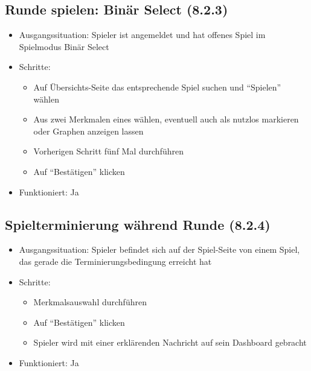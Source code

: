 \documentclass[a4paper]{scrreprt}
\begin{document}
            \subsection{Runde spielen: Binär Select (8.2.3)}
            \begin{itemize}
                \item Ausgangssituation: Spieler ist angemeldet und hat offenes Spiel im Spielmodus Binär Select
                \item Schritte:
                    \begin{itemize}
                        \item Auf Übersichts-Seite das entsprechende Spiel suchen und \enquote{Spielen} wählen
                        \item Aus zwei Merkmalen eines wählen, eventuell auch als nutzlos markieren oder Graphen anzeigen lassen
                        \item Vorherigen Schritt fünf Mal durchführen
                        \item Auf \enquote{Bestätigen} klicken
                    \end{itemize}
                \item Funktioniert: Ja
            \end{itemize}

            \subsection{Spielterminierung während Runde (8.2.4)}
            \begin{itemize}
                \item Ausgangssituation: Spieler befindet sich auf der Spiel-Seite von einem Spiel, das gerade die Terminierungsbedingung erreicht hat
                \item Schritte:
                    \begin{itemize}
                        \item Merkmalsauswahl durchführen
                        \item Auf \enquote{Bestätigen} klicken
                        \item Spieler wird mit einer erklärenden Nachricht auf sein Dashboard gebracht
                    \end{itemize}
                \item Funktioniert: Ja
            \end{itemize}
\end{document}
